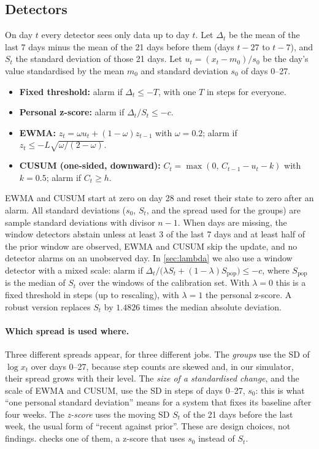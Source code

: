 \documentclass[11pt,a4paper]{article}
\begin{document}
\subsection{Detectors}
On day $t$ every detector sees only data up to day $t$.
Let $\Delta_t$ be the mean of the last 7 days minus the mean of the 21 days before them (days $t-27$ to $t-7$), and $S_t$ the standard deviation of those 21 days.
Let $u_t=(x_t-m_0)/s_0$ be the day's value standardised by the mean $m_0$ and standard deviation $s_0$ of days 0--27.
\begin{itemize}
  \item \textbf{Fixed threshold:} alarm if $\Delta_t\le -T$, with one $T$ in steps for everyone.
  \item \textbf{Personal z-score:} alarm if $\Delta_t/S_t\le -c$.
  \item \textbf{EWMA:} $z_t=\omega u_t+(1-\omega)z_{t-1}$ with $\omega=0.2$; alarm if $z_t\le -L\sqrt{\omega/(2-\omega)}$.
  \item \textbf{CUSUM (one-sided, downward):} $C_t=\max(0,\,C_{t-1}-u_t-k)$ with $k=0.5$; alarm if $C_t\ge h$.
\end{itemize}
EWMA and CUSUM start at zero on day 28 and reset their state to zero after an alarm. All standard deviations ($s_0$, $S_t$, and the spread used for the groups) are sample standard deviations with divisor $n-1$.
When days are missing, the window detectors abstain unless at least 3 of the last 7 days and at least half of the prior window are observed, EWMA and CUSUM skip the update, and no detector alarms on an unobserved day.
In \cref{sec:lambda} we also use a window detector with a mixed scale: alarm if $\Delta_t/\bigl(\lambda S_t+(1-\lambda)S_{\mathrm{pop}}\bigr)\le -c$, where $S_{\mathrm{pop}}$ is the median of $S_t$ over the windows of the calibration set. With $\lambda=0$ this is a fixed threshold in steps (up to rescaling), with $\lambda=1$ the personal z-score. A robust version replaces $S_t$ by $1.4826$ times the median absolute deviation.
\paragraph{Which spread is used where.}
Three different spreads appear, for three different jobs. The \emph{groups} use the SD of $\log x_t$ over days 0--27, because step counts are skewed and, in our simulator, their spread grows with their level. The \emph{size of a standardised change}, and the scale of EWMA and CUSUM, use the SD in steps of days 0--27, $s_0$: this is what ``one personal standard deviation'' means for a system that fixes its baseline after four weeks. The \emph{z-score} uses the moving SD $S_t$ of the 21 days before the last week, the usual form of ``recent against prior''. These are design choices, not findings.  checks one of them, a z-score that uses $s_0$ instead of $S_t$.
\end{document}
